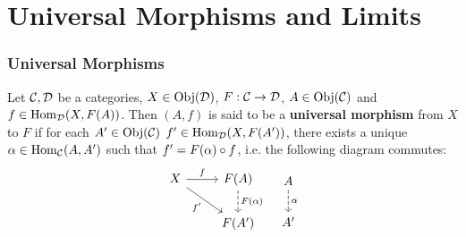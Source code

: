 \documentclass{book}
\begin{document}
	
	
	
	
	
	
	
	
	
	
	
	
	
	
	
	
	
	
	
	
	
	
	
	
	
	
	
	
	
	
	
	
	
	
	
	
	
	
	
	
	
	
	
	
	
	
	
	
	
	
	\newpage
	\chapter{Universal Morphisms and Limits}
	
	\subsection{Universal Morphisms}

	\begin{defn}
		Let $\mathcal{C}, \mathcal{D}$ be a categories, $X \in \operatorname{Obj}(\mathcal{D})$, $F: \mathcal{C} \rightarrow \mathcal{D}$, $A \in \operatorname{Obj}(\mathcal{C})$ and $f \in \operatorname{Hom}_{\mathcal{D}}(X, F(A))$. Then $(A, f)$ is said to be a \textbf{universal morphism} from $X$ to $F$ if for each $A' \in \operatorname{Obj}(\mathcal{C})$ $f' \in \operatorname{Hom}_{\mathcal{D}}(X, F(A'))$, there exists a unique $\alpha \in \operatorname{Hom}_{\mathcal{C}}(A, A')$ such that $f' = F(\alpha) \circ f$, i.e. the following diagram commutes:
		\[
		\begin{tikzcd}
			X \arrow[r, "f"]  \arrow[dr, "f'"'] & F(A) \arrow[d, "F(\al)", dashed] \\
			                                    & F(A')  
		\end{tikzcd}
		\hspace{.3cm}
		\begin{tikzcd}
			A  \arrow[d, "\al", dashed] \\
			A'  
		\end{tikzcd}
		\]
	\end{defn}
\end{document}
